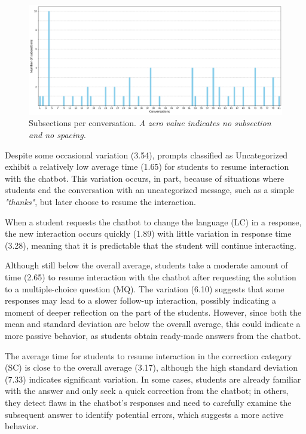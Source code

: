 \documentclass[a4paper,twoside]{article}
\begin{document}
\begin{figure}[htbp]
  \centering
  \includegraphics[scale=0.39]{img/figure3.png}
  \caption{Subsections per conversation. \textit{A zero value indicates
  no subsection and no spacing.}}
  \label{fig:graph3}
\end{figure}

Despite some occasional variation (3.54), prompts classified as Uncategorized
exhibit a relatively low average time (1.65) for students to resume interaction
with the chatbot. This variation occurs, in part, because of situations where students
end the conversation with an uncategorized message, such as a simple
\textit{"thanks"}, but later choose to resume the interaction.

When a student requests the chatbot to change the language (LC) in a response, the
new interaction occurs quickly (1.89) with little variation in response time
(3.28), meaning that it is predictable that the student will continue interacting.

Although still below the overall average, students take a moderate amount of
time (2.65) to resume interaction with the chatbot after requesting the solution to
a multiple-choice question (MQ). The variation (6.10) suggests that some
responses may lead to a slower follow-up interaction, possibly indicating a
moment of deeper reflection on the part of the students. However, since both the
mean and standard deviation are below the overall average, this could indicate
a more passive behavior, as students obtain ready-made answers from the chatbot.

The average time for students to resume interaction in the correction category
(SC) is close to the overall average (3.17), although the high standard
deviation (7.33) indicates significant variation. In some cases, students are
already familiar with the answer and only seek a quick correction from the chatbot;
in others, they detect flaws in the chatbot's responses and need to carefully
examine the subsequent answer to identify potential errors, which suggests a
more active behavior.
\end{document}
